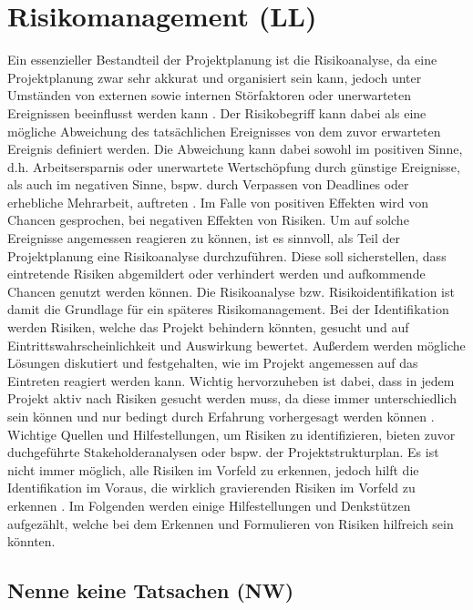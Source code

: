 \documentclass[ThesisDJ.tex]{subfiles}
\begin{document}
\section{Risikomanagement (LL)}
Ein essenzieller Bestandteil der Projektplanung ist die Risikoanalyse, da eine Projektplanung zwar sehr akkurat und organisiert sein kann, jedoch unter Umständen von externen sowie internen Störfaktoren oder unerwarteten Ereignissen beeinflusst werden kann \cite{cicek2022risikomanagement}.
Der Risikobegriff kann dabei als eine mögliche Abweichung des tatsächlichen Ereignisses von dem zuvor erwarteten Ereignis definiert werden. Die Abweichung kann dabei sowohl im positiven Sinne, d.h. Arbeitsersparnis oder unerwartete Wertschöpfung durch günstige Ereignisse, als auch im negativen Sinne, bspw. durch Verpassen von Deadlines oder erhebliche Mehrarbeit, auftreten \cite{holgerseibold2006}. Im Falle von positiven Effekten wird von Chancen gesprochen, bei negativen Effekten von Risiken. Um auf solche Ereignisse angemessen reagieren zu können, ist es sinnvoll, als Teil der Projektplanung eine Risikoanalyse durchzuführen. Diese soll sicherstellen, dass eintretende Risiken abgemildert oder verhindert werden und aufkommende Chancen genutzt werden können. Die Risikoanalyse bzw. Risikoidentifikation ist damit die Grundlage für ein späteres Risikomanagement.
Bei der Identifikation werden Risiken, welche das Projekt behindern könnten, gesucht und auf Eintrittswahrscheinlichkeit und Auswirkung bewertet. Außerdem werden mögliche Lösungen diskutiert und festgehalten, wie im Projekt angemessen auf das Eintreten reagiert werden kann. Wichtig hervorzuheben ist dabei, dass in jedem Projekt aktiv nach Risiken gesucht werden muss, da diese immer unterschiedlich sein können und nur bedingt durch Erfahrung vorhergesagt werden können \cite{cicek2022risikomanagement}. Wichtige Quellen und Hilfestellungen, um Risiken zu identifizieren, bieten zuvor duchgeführte Stakeholderanalysen oder bspw. der Projektstrukturplan. Es ist nicht immer möglich, alle Risiken im Vorfeld zu erkennen, jedoch hilft die Identifikation im Voraus, die wirklich gravierenden Risiken im Vorfeld zu erkennen \cite{holgerseibold2006}. Im Folgenden werden einige Hilfestellungen und Denkstützen aufgezählt, welche bei dem Erkennen und Formulieren von Risiken hilfreich sein könnten.

\subsection{Nenne keine Tatsachen (NW)}
\end{document}
